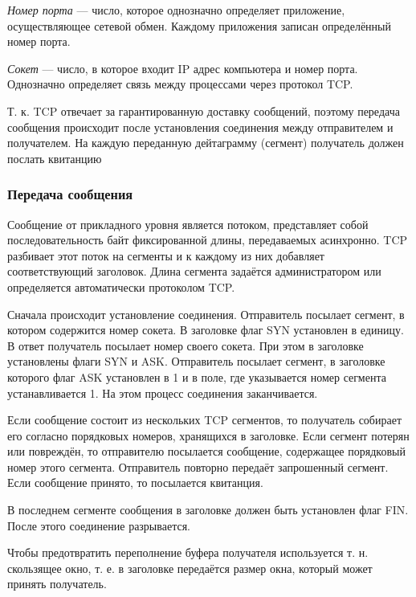 \documentclass[12pt, russian, oneside, article]{ncc}
\begin{document}
\emph{Номер порта} --- число, которое однозначно определяет приложение, осуществляющее сетевой обмен. Каждому приложения записан определённый номер порта.

\emph{Сокет} --- число, в которое входит IP адрес компьютера и номер порта. Однозначно определяет связь между процессами через протокол TCP.

Т. к. TCP отвечает за гарантированную доставку сообщений, поэтому передача сообщения происходит после установления соединения между отправителем и получателем. На каждую переданную дейтаграмму (сегмент) получатель должен послать квитанцию
\subsubsection{Передача сообщения}
\label{sec-5_1_1}


Сообщение от прикладного уровня является потоком, представляет собой последовательность байт фиксированной длины, передаваемых асинхронно.
TCP разбивает этот поток на сегменты и к каждому из них добавляет соответствующий заголовок. Длина сегмента задаётся администратором или определяется автоматически протоколом TCP.

Сначала происходит установление соединения. Отправитель посылает сегмент, в котором содержится номер сокета. В заголовке флаг SYN установлен в единицу. В ответ получатель посылает номер своего сокета. При этом в заголовке установлены флаги SYN и ASK. Отправитель посылает сегмент, в заголовке которого флаг ASK установлен в 1 и в поле, где указывается номер сегмента устанавливается 1. На этом процесс соединения заканчивается.

Если сообщение состоит из нескольких TCP сегментов, то получатель собирает его согласно порядковых номеров, хранящихся в заголовке. Если сегмент потерян или повреждён, то отправителю посылается сообщение, содержащее порядковый номер этого сегмента. Отправитель повторно передаёт запрошенный сегмент. Если сообщение принято, то посылается квитанция.

В последнем сегменте сообщения в заголовке должен быть установлен флаг FIN. После этого соединение разрывается.

Чтобы предотвратить переполнение буфера получателя используется т. н. скользящее окно, т. е. в заголовке передаётся размер окна, который может принять получатель.
\end{document}
